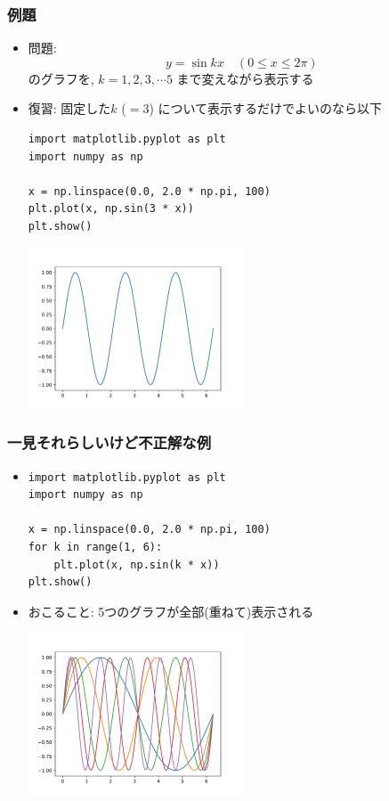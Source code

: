 \documentclass[10pt,dvipdfmx]{beamer}
\begin{document}
\begin{frame}[fragile]
  \frametitle{例題}
  \begin{itemize}
  \item 問題:
  \[ y = \sin k x \quad (0 \leq x \leq 2\pi) \]
  のグラフを, $k = 1, 2, 3, \cdots 5$
  まで変えながら表示する
\item 復習: 固定した$k$ ($= 3$)
  について表示するだけでよいのなら以下
\begin{lstlisting}
import matplotlib.pyplot as plt
import numpy as np

x = np.linspace(0.0, 2.0 * np.pi, 100)
plt.plot(x, np.sin(3 * x))
plt.show()    
\end{lstlisting}

\begin{center}
\includegraphics[width=0.5\textwidth]{out/pdf/svg/sinkx.pdf}  
\end{center}
  \end{itemize}
\end{frame}

\begin{frame}[fragile]
  \frametitle{一見それらしいけど不正解な例}
  \begin{itemize}
  \item []
\begin{lstlisting}
import matplotlib.pyplot as plt
import numpy as np

x = np.linspace(0.0, 2.0 * np.pi, 100)
for k in range(1, 6):
    plt.plot(x, np.sin(k * x))
plt.show()
\end{lstlisting}
\item おこること:
  5つのグラフが全部(重ねて)表示される

\begin{center}
\includegraphics[width=0.5\textwidth]{out/pdf/svg/sinkx_all.pdf}  
\end{center}
  
\end{itemize}
\end{frame}
\end{document}
